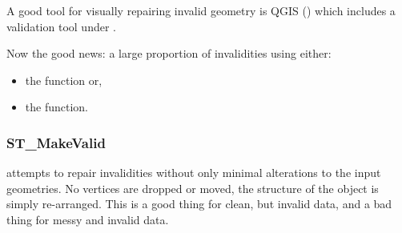 \documentclass[a4paper,11pt,english]{sphinxmanual}
\begin{document}
A good tool for visually repairing invalid geometry is QGIS () which includes a validation tool under .

Now the good news: a large proportion of invalidities  using either:
\begin{itemize}
\item {} 
the  function or,

\item {} 
the  function.

\end{itemize}


\subsubsection{ST\_MakeValid}
\label{\detokenize{advanced:st-makevalid}}
 attempts to repair invalidities without only minimal alterations to the input geometries. No vertices are dropped or moved, the structure of the object is simply re-arranged. This is a good thing for clean, but invalid data, and a bad thing for messy and invalid data.

\begin{sphinxVerbatim}[commandchars=\\\{\}]
 
\end{sphinxVerbatim}

\begin{sphinxVerbatim}[commandchars=\\\{\}]
       
       
\end{sphinxVerbatim}
\end{document}
